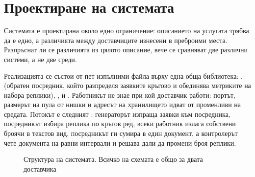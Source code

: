 \section{Проектиране на системата}
\label{sec:design}

Системата е проектирана около едно ограничение: описанието на услугата трябва да е едно, а
различията между доставчиците изнесени в преброими места. Разпръснат ли се различията из цялото
описание, вече се сравняват две различни системи, а не две среди.

Реализацията се състои от пет изпълними файла върху една обща библиотека:
,  (обратен посредник, който разпределя заявките кръгово
и обединява метриките на набора реплики), ,  и
. Работникът не знае при кой доставчик работи: портът, размерът на пула от
нишки и адресът на хранилището идват от променливи на средата. Потокът е следният
: генераторът изпраща заявки към посредника, посредникът избира реплика по
кръгов ред, всеки работник излага собствени броячи в текстов вид, посредникът ги сумира в един
документ, а контролерът чете документа на равни интервали и решава дали да промени броя реплики.

\begin{figure}[H]
\centering
{}
\caption{Структура на системата. Всичко на схемата е общо за двата доставчика}
\label{fig:arch}
\end{figure}

